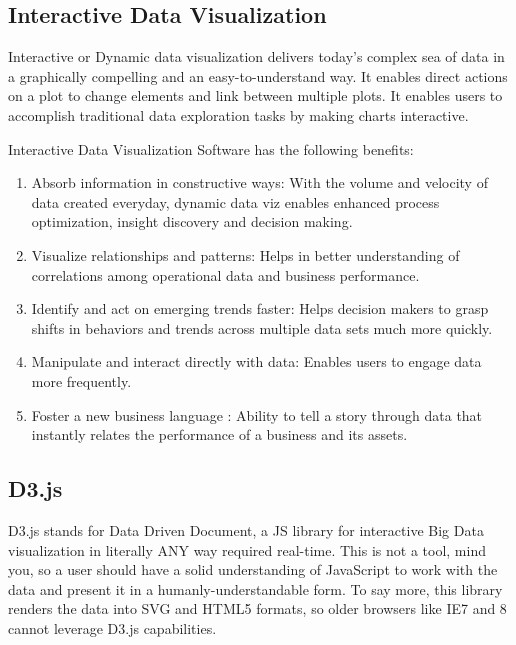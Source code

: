 \documentclass[]{book}
\providecommand{\tightlist}{%
  \setlength{\itemsep}{0pt}\setlength{\parskip}{0pt}}
\theoremstyle{definition}
\theoremstyle{definition}
\theoremstyle{definition}
\theoremstyle{remark}
\begin{document}
\subsection{Interactive Data
Visualization}\label{interactive-data-visualization}

Interactive or Dynamic data visualization delivers today's complex sea
of data in a graphically compelling and an easy-to-understand way. It
enables direct actions on a plot to change elements and link between
multiple plots. It enables users to accomplish traditional data
exploration tasks by making charts
interactive\citep{benefits_interactive_viz}.

Interactive Data Visualization Software has the following benefits:

\begin{enumerate}
\def\labelenumi{\arabic{enumi}.}
\tightlist
\item
  Absorb information in constructive ways: With the volume and velocity
  of data created everyday, dynamic data viz enables enhanced process
  optimization, insight discovery and decision making.
\item
  Visualize relationships and patterns: Helps in better understanding of
  correlations among operational data and business performance.
\item
  Identify and act on emerging trends faster: Helps decision makers to
  grasp shifts in behaviors and trends across multiple data sets much
  more quickly.
\item
  Manipulate and interact directly with data: Enables users to engage
  data more frequently.
\item
  Foster a new business language : Ability to tell a story through data
  that instantly relates the performance of a business and its assets.
\end{enumerate}

\subsection{D3.js}\label{d3.js}

D3.js stands for Data Driven Document, a JS library for interactive Big
Data visualization in literally ANY way required
real-time\citep{d3_interactive_viz}. This is not a tool, mind you, so a
user should have a solid understanding of JavaScript to work with the
data and present it in a humanly-understandable form. To say more, this
library renders the data into SVG and HTML5 formats, so older browsers
like IE7 and 8 cannot leverage D3.js capabilities.
\end{document}
